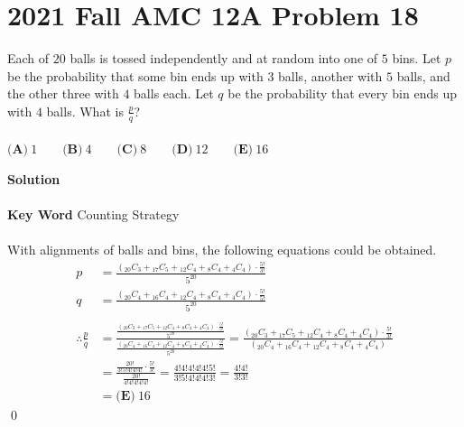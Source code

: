 \documentclass{article}
\newenvironment{solution}{\begin{trivlist}\item[]{\bf Solution}}{\qed \end{trivlist}}
\begin{document}
\section*{2021 Fall AMC 12A Problem 18}
Each of $20$ balls is tossed independently and at random into one of $5$ bins. Let $p$ be the probability that some bin ends up with $3$ balls, another with $5$ balls, and the other three with $4$ balls each. Let $q$ be the probability that every bin ends up with $4$ balls. What is $\frac{p}{q}$?
\\\\
$\textbf{(A)}\ 1 \qquad\textbf{(B)}\  4 \qquad\textbf{(C)}\  8 \qquad\textbf{(D)}\  12 \qquad\textbf{(E)}\ 16$
\begin{solution}
\\\\
\textbf{Key Word} Counting Strategy
\\\\
With alignments of balls and bins, the following equations could be obtained.
\begin{align*}
    p &= \frac{({}_{20}C_3 + {}_{17}C_5 + {}_{12}C_4 + {}_8C_4 + {}_4C_4) \cdot \frac{5!}{3!}}{5^{20}} \\
    q &= \frac{({}_{20}C_4 + {}_{16}C_4 + {}_{12}C_4 + {}_8C_4 + {}_4C_4) \cdot \frac{5!}{5!}}{5^{20}}
    \\\\
    \therefore \frac{p}{q}
    &= \frac{\frac{({}_{20}C_3 + {}_{17}C_5 + {}_{12}C_4 + {}_8C_4 + {}_4C_4) \cdot \frac{5!}{3!}}{5^{20}}}{\frac{({}_{20}C_4 + {}_{16}C_4 + {}_{12}C_4 + {}_8C_4 + {}_4C_4) \cdot \frac{5!}{5!}}{5^{20}}} = \frac{({}_{20}C_3 + {}_{17}C_5 + {}_{12}C_4 + {}_8C_4 + {}_4C_4) \cdot \frac{5!}{3!}}{({}_{20}C_4 + {}_{16}C_4 + {}_{12}C_4 + {}_8C_4 + {}_4C_4)} \\
    &= \frac{\frac{20!}{3!5!4!4!4!} \cdot \frac{5!}{3!}}{\frac{20!}{4!4!4!4!4!}} = \frac{4!4!4!4!4!5!}{3!5!4!4!4!3!} = \frac{4!4!}{3!3!} \\
    &= \boxed{\textbf{(E)}\ 16}
\end{align*}
\end{solution}

\newpage
\end{document}
